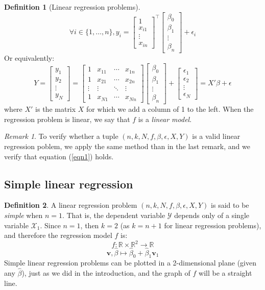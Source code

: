\documentclass{article}
\theoremstyle{definition}
\newtheorem{definition}{Definition}[section]
\theoremstyle{remark}
\newtheorem*{remark}{Remark}
\theoremstyle{example}
\newcommand{\vv}{\mathbf{v}}
\newcommand{\betat}{\hat{\beta}}
\newcommand{\fvector}[2]{\begin{bmatrix} #1_1 \\ #1_2 \\ \vdots \\ #1_{#2} \end{bmatrix}}
\begin{document}
\begin{definition}[Linear regression problems]
				$$\forall i \in \{1, \dots, n\}, y_i = \begin{bmatrix} 1 \\ x_{i1} \\ \vdots \\ x_{in} \end{bmatrix}^\top \begin{bmatrix} \beta_0 \\ \beta_1 \\ \vdots \\ \beta_n \end{bmatrix} + \epsilon_i$$
		Or equivalently:
				$$Y = \fvector{y}{N} = \begin{bmatrix} 1 & x_{11} & \cdots & x_{1n} \\ 1 & x_{21} & \cdots & x_{2n} \\ \vdots & \vdots & \ddots & \vdots \\ 1 & x_{N1} & \cdots & x_{Nn} \end{bmatrix} \begin{bmatrix} \beta_0 \\ \beta_1 \\ \vdots \\ \beta_n \end{bmatrix} + \fvector{\epsilon}{N} = X' \beta + \epsilon$$
		where $X'$ is the matrix $X$ for which we add a column of 1 to the left. When the regression problem is linear, we say that $f$ is a \textit{linear model}.
\end{definition}

\begin{remark}
		To verify whether a tuple $(n, k, N, f, \beta, \epsilon, X, Y)$ is a valid linear regression poblem, we apply the same method than in the last remark, and we verify that equation (\ref{eqn1}) holds.
\end{remark}

\subsection{Simple linear regression}

\begin{definition}
		A linear regression problem $(n, k, N, f, \beta, \epsilon, X, Y)$ is said to be \textit{simple} when $n=1$. That is, the dependent variable $\mathcal{Y}$ depends only of a single variable $\mathcal{X}_1$. Since $n=1$, then $k=2$ (as $k=n+1$ for linear regression problems), and therefore the regression model $f$ is:
				$$f : \mathbb{R} \times \mathbb{R}^2 \rightarrow \mathbb{R}$$
				$$\vv, \betat \mapsto \betat_0 + \betat_1 \vv_1$$
		Simple linear regression problems can be plotted in a 2-dimensional plane (given any $\betat$), just as we did in the introduction, and the graph of $f$ will be a straight line.
\end{definition}
\end{document}
